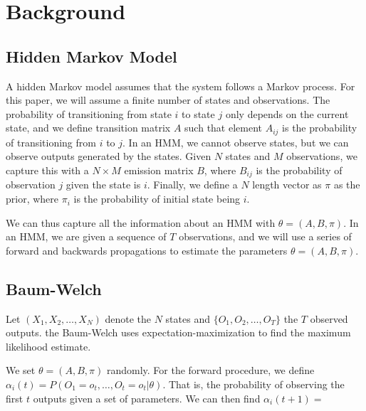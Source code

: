 \section{Background}

\subsection{Hidden Markov Model}
A hidden Markov model assumes that the system follows a Markov process. For this paper, we will assume a finite number of states and observations. The probability of transitioning from state $i$ to state $j$ only depends on the current state, and we define transition matrix $A$ such that element $A_{ij}$ is the probability  of transitioning from $i$ to $j$. In an HMM, we cannot observe states, but we can observe outputs generated by the states. Given $N$ states and $M$ observations, we capture this with a $N \times M$ emission matrix $B$, where $B_{ij}$ is the probability of observation $j$ given the state is $i$. Finally, we define a $N$ length vector as $\pi$ as the prior, where $\pi_i$ is the probability of initial state being $i$. 

We can thus capture all the information about an HMM with $\theta = (A, B, \pi)$. In an HMM, we are given a sequence of $T$ observations, and we will use a series of forward and backwards propagations to estimate the parameters $\theta = (A, B, \pi)$.

\subsection{Baum-Welch}
Let $(X_1, X_2, \ldots, X_N)$ denote the $N$ states and $\{O_1, O_2, \ldots, O_T\}$ the $T$ observed outputs. the Baum-Welch uses expectation-maximization to find the maximum likelihood estimate.

We set $\theta  =  (A, B, \pi)$ randomly. For the forward procedure, we define $\alpha_i(t) = P(O_1 = o_t, \ldots, O_t = o_t | \theta)$. That is, the probability of observing the first $t$ outputs given a set of parameters. We can then find $\alpha_i(t+1) =  $


